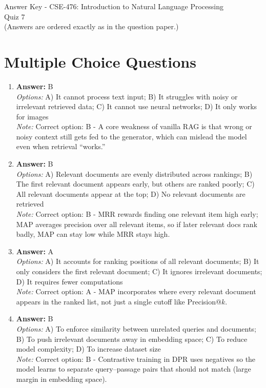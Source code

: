 \documentclass[12pt]{article}
\begin{document}
\begin{center}
Answer Key - CSE-476: Introduction to Natural Language Processing \\
Quiz 7 \\
\small (Answers are ordered exactly as in the question paper.)
\end{center}

\section*{Multiple Choice Questions}
\begin{enumerate}[label=Q\arabic*.]
\item \textbf{Answer:} B
\\ \textit{Options:} A) It cannot process text input; B) It struggles with noisy or irrelevant retrieved data; C) It cannot use neural networks; D) It only works for images
\\ \textit{Note:} Correct option: B - A core weakness of vanilla RAG is that wrong or noisy context still gets fed to the generator, which can mislead the model even when retrieval ``works.''
\item \textbf{Answer:} B
\\ \textit{Options:} A) Relevant documents are evenly distributed across rankings; B) The first relevant document appears early, but others are ranked poorly; C) All relevant documents appear at the top; D) No relevant documents are retrieved
\\ \textit{Note:} Correct option: B - MRR rewards finding one relevant item high early; MAP averages precision over all relevant items, so if later relevant docs rank badly, MAP can stay low while MRR stays high.
\item \textbf{Answer:} A
\\ \textit{Options:} A) It accounts for ranking positions of all relevant documents; B) It only considers the first relevant document; C) It ignores irrelevant documents; D) It requires fewer computations
\\ \textit{Note:} Correct option: A - MAP incorporates where every relevant document appears in the ranked list, not just a single cutoff like Precision@$k$.
\item \textbf{Answer:} B
\\ \textit{Options:} A) To enforce similarity between unrelated queries and documents; B) To push irrelevant documents away in embedding space; C) To reduce model complexity; D) To increase dataset size
\\ \textit{Note:} Correct option: B - Contrastive training in DPR uses negatives so the model learns to separate query--passage pairs that should not match (large margin in embedding space).

\end{enumerate}
\end{document}
